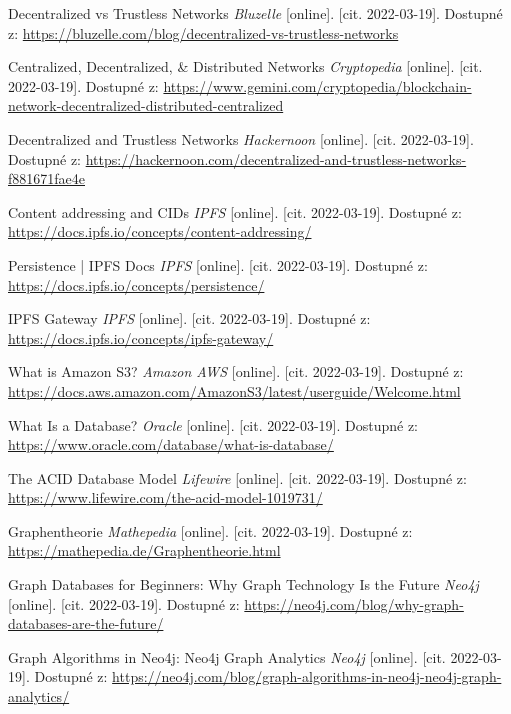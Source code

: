 \begin{thebibliography}{100}
     Decentralized vs Trustless Networks \textit{Bluzelle} [online]. [cit. 2022-03-19]. Dostupné z: \url{https://bluzelle.com/blog/decentralized-vs-trustless-networks}
    
     Centralized, Decentralized, \& Distributed Networks \textit{Cryptopedia} [online]. [cit. 2022-03-19]. Dostupné z: \url{https://www.gemini.com/cryptopedia/blockchain-network-decentralized-distributed-centralized}
    
     Decentralized and Trustless Networks \textit{Hackernoon} [online]. [cit. 2022-03-19]. Dostupné z: \url{https://hackernoon.com/decentralized-and-trustless-networks-f881671fae4e}
    
     Content addressing and CIDs \textit{IPFS} [online]. [cit. 2022-03-19]. Dostupné z: \url{https://docs.ipfs.io/concepts/content-addressing/}
    
     Persistence | IPFS Docs \textit{IPFS} [online]. [cit. 2022-03-19]. Dostupné z: \url{https://docs.ipfs.io/concepts/persistence/}
    
     IPFS Gateway \textit{IPFS} [online]. [cit. 2022-03-19]. Dostupné z: \url{https://docs.ipfs.io/concepts/ipfs-gateway/}
    
     What is Amazon S3? \textit{Amazon AWS} [online]. [cit. 2022-03-19]. Dostupné z: \url{https://docs.aws.amazon.com/AmazonS3/latest/userguide/Welcome.html}
    
     What Is a Database? \textit{Oracle} [online]. [cit. 2022-03-19]. Dostupné z: \url{https://www.oracle.com/database/what-is-database/}
    
     The ACID Database Model \textit{Lifewire} [online]. [cit. 2022-03-19]. Dostupné z: \url{https://www.lifewire.com/the-acid-model-1019731/}
    
     Graphentheorie \textit{Mathepedia} [online]. [cit. 2022-03-19]. Dostupné z: \url{https://mathepedia.de/Graphentheorie.html}
    
     Graph Databases for Beginners: Why Graph Technology Is the Future \textit{Neo4j} [online]. [cit. 2022-03-19]. Dostupné z: \url{https://neo4j.com/blog/why-graph-databases-are-the-future/}
    
     Graph Algorithms in Neo4j: Neo4j Graph Analytics \textit{Neo4j} [online]. [cit. 2022-03-19]. Dostupné z: \url{https://neo4j.com/blog/graph-algorithms-in-neo4j-neo4j-graph-analytics/}
    

\end{thebibliography}
